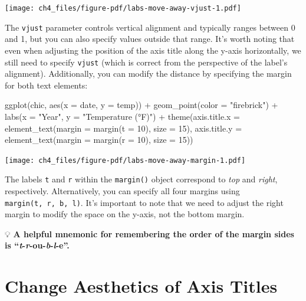 \documentclass[
  letterpaper,
  DIV=11,
  numbers=noendperiod]{scrreprt}
\newenvironment{Shaded}{\begin{snugshade}}{\end{snugshade}}
\newcommand{\AttributeTok}[1]{\textcolor[rgb]{0.40,0.45,0.13}{#1}}
\newcommand{\DecValTok}[1]{\textcolor[rgb]{0.68,0.00,0.00}{#1}}
\newcommand{\FunctionTok}[1]{\textcolor[rgb]{0.28,0.35,0.67}{#1}}
\newcommand{\NormalTok}[1]{\textcolor[rgb]{0.00,0.23,0.31}{#1}}
\newcommand{\SpecialCharTok}[1]{\textcolor[rgb]{0.37,0.37,0.37}{#1}}
\newcommand{\StringTok}[1]{\textcolor[rgb]{0.13,0.47,0.30}{#1}}
\begin{document}
\texttt{[image: ch4\_files/figure-pdf/labs-move-away-vjust-1.pdf]}

The \texttt{vjust} parameter controls vertical alignment and typically
ranges between 0 and 1, but you can also specify values outside that
range. It's worth noting that even when adjusting the position of the
axis title along the y-axis horizontally, we still need to specify
\texttt{vjust} (which is correct from the perspective of the label's
alignment). Additionally, you can modify the distance by specifying the
margin for both text elements:

\begin{Shaded}
\begin{Highlighting}[]
\FunctionTok{ggplot}\NormalTok{(chic, }\FunctionTok{aes}\NormalTok{(}\AttributeTok{x =}\NormalTok{ date, }\AttributeTok{y =}\NormalTok{ temp)) }\SpecialCharTok{+}
  \FunctionTok{geom\_point}\NormalTok{(}\AttributeTok{color =} \StringTok{"firebrick"}\NormalTok{) }\SpecialCharTok{+}
  \FunctionTok{labs}\NormalTok{(}\AttributeTok{x =} \StringTok{"Year"}\NormalTok{, }\AttributeTok{y =} \StringTok{"Temperature (°F)"}\NormalTok{) }\SpecialCharTok{+}
  \FunctionTok{theme}\NormalTok{(}\AttributeTok{axis.title.x =} \FunctionTok{element\_text}\NormalTok{(}\AttributeTok{margin =} \FunctionTok{margin}\NormalTok{(}\AttributeTok{t =} \DecValTok{10}\NormalTok{), }\AttributeTok{size =} \DecValTok{15}\NormalTok{),}
        \AttributeTok{axis.title.y =} \FunctionTok{element\_text}\NormalTok{(}\AttributeTok{margin =} \FunctionTok{margin}\NormalTok{(}\AttributeTok{r =} \DecValTok{10}\NormalTok{), }\AttributeTok{size =} \DecValTok{15}\NormalTok{))}
\end{Highlighting}
\end{Shaded}

\texttt{[image: ch4\_files/figure-pdf/labs-move-away-margin-1.pdf]}

The labels \texttt{t} and \texttt{r} within the \texttt{margin()} object
correspond to \emph{top} and \emph{right}, respectively. Alternatively,
you can specify all four margins using \texttt{margin(t,\ r,\ b,\ l)}.
It's important to note that we need to adjust the right margin to modify
the space on the y-axis, not the bottom margin.

💡 \textbf{A helpful mnemonic for remembering the order of the margin
sides is ``\emph{t}-\emph{r}-ou-\emph{b}-\emph{l}-e''.}

\section{Change Aesthetics of Axis
Titles}\label{change-aesthetics-of-axis-titles}
\end{document}
